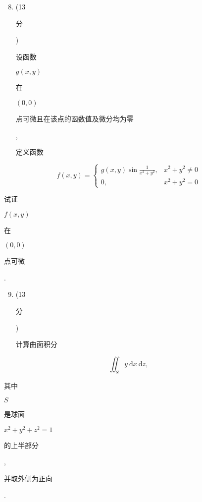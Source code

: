 \documentclass[10pt]{article}
\begin{document}
\begin{enumerate}
  \setcounter{enumi}{7}
  \item (13 \begin{CJK}{UTF8}{mj}分\end{CJK}) \begin{CJK}{UTF8}{mj}设函数\end{CJK} $g(x, y)$ \begin{CJK}{UTF8}{mj}在\end{CJK} $(0,0)$ \begin{CJK}{UTF8}{mj}点可微且在该点的函数值及微分均为零\end{CJK}, \begin{CJK}{UTF8}{mj}定义函数\end{CJK}
\end{enumerate}
$$
f(x, y)= \begin{cases}g(x, y) \sin \frac{1}{x^{2}+y^{2}}, & x^{2}+y^{2} \neq 0 \\ 0, & x^{2}+y^{2}=0\end{cases}
$$
\begin{CJK}{UTF8}{mj}试证\end{CJK} $f(x, y)$ \begin{CJK}{UTF8}{mj}在\end{CJK} $(0,0)$ \begin{CJK}{UTF8}{mj}点可微\end{CJK}.

\begin{enumerate}
  \setcounter{enumi}{8}
  \item (13 \begin{CJK}{UTF8}{mj}分\end{CJK}) \begin{CJK}{UTF8}{mj}计算曲面积分\end{CJK}
\end{enumerate}
$$
\iint_{S} y \mathrm{~d} x \mathrm{~d} z,
$$
\begin{CJK}{UTF8}{mj}其中\end{CJK} $S$ \begin{CJK}{UTF8}{mj}是球面\end{CJK} $x^{2}+y^{2}+z^{2}=1$ \begin{CJK}{UTF8}{mj}的上半部分\end{CJK}, \begin{CJK}{UTF8}{mj}并取外侧为正向\end{CJK}.
\end{document}
